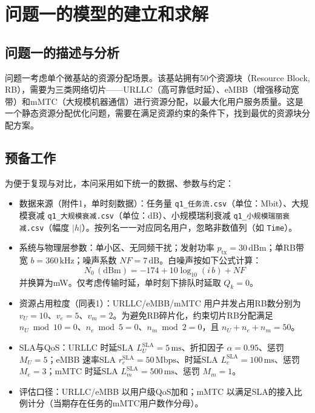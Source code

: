 \section{问题一的模型的建立和求解}
\subsection{问题一的描述与分析}

问题一考虑单个微基站的资源分配场景。该基站拥有50个资源块（Resource Block, RB），需要为三类网络切片——URLLC（高可靠低时延）、eMBB（增强移动宽带）和mMTC（大规模机器通信）进行资源分配，以最大化用户服务质量。这是一个静态资源分配优化问题，需要在满足资源约束的条件下，找到最优的资源块分配方案。

\subsection{预备工作}
为便于复现与对比，本问采用如下统一的数据、参数与约定：

\begin{itemize}
  \item 数据来源（附件1，单时刻数据）：任务量 \texttt{q1\_任务流.csv}（单位：Mbit）、大规模衰减 \texttt{q1\_大规模衰减.csv}（单位：dB）、小规模瑞利衰减 \texttt{q1\_小规模瑞丽衰减.csv}（幅度 $|h|$）。按列名一一对应同名用户，忽略非数值列（如 \texttt{Time}）。
  \item 系统与物理层参数：单小区、无同频干扰；发射功率 $p_{\mathrm{tx}}=30\,\mathrm{dBm}$；单RB带宽 $b=360\,\mathrm{kHz}$；噪声系数 $NF=7\,\mathrm{dB}$。白噪声按如下公式计算：
  \begin{equation}
    N_0\,(\mathrm{dBm}) = -174 + 10\log_{10}(i\,b) + NF
  \end{equation}
  并换算为mW。仅考虑传输时延，单时刻下排队时延取 $Q_k=0$。
  \item 资源占用粒度（同表1）：URLLC/eMBB/mMTC 用户并发占用RB数分别为 $v_U=10$、$v_e=5$、$v_m=2$。为避免RB碎片化，约束切片RB分配满足 $n_U\bmod 10=0$、$n_e\bmod 5=0$、$n_m\bmod 2=0$，且 $n_U+n_e+n_m=50$。
  \item SLA与QoS：URLLC 时延SLA $L_U^{\mathrm{SLA}}=5\,\mathrm{ms}$、折扣因子 $\alpha=0.95$、惩罚 $M_U=5$；eMBB 速率SLA $r_e^{\mathrm{SLA}}=50\,\mathrm{Mbps}$、时延SLA $L_e^{\mathrm{SLA}}=100\,\mathrm{ms}$、惩罚 $M_e=3$；mMTC 时延SLA $L_m^{\mathrm{SLA}}=500\,\mathrm{ms}$、惩罚 $M_m=1$。
  \item 评估口径：URLLC/eMBB 以用户级QoS加和；mMTC 以满足SLA的接入比例计分（当期存在任务的mMTC用户数作分母）。
\end{itemize}
